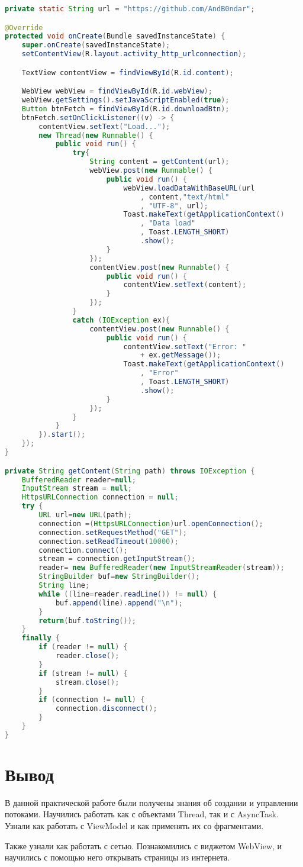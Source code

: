 \begin{lstlisting}[language=Java
	, label=lst:java:http-url-connection
	]
private static String url = "https://github.com/AndB0ndar";

@Override
protected void onCreate(Bundle savedInstanceState) {
	super.onCreate(savedInstanceState);
	setContentView(R.layout.activity_http_urlconnection);

	TextView contentView = findViewById(R.id.content);

	WebView webView = findViewById(R.id.webView);
	webView.getSettings().setJavaScriptEnabled(true);
	Button btnFetch = findViewById(R.id.downloadBtn);
	btnFetch.setOnClickListener((v) -> {
		contentView.setText("Load...");
		new Thread(new Runnable() {
			public void run() {
				try{
					String content = getContent(url);
					webView.post(new Runnable() {
						public void run() {
							webView.loadDataWithBaseURL(url
								, content,"text/html"
								, "UTF-8", url);
							Toast.makeText(getApplicationContext()
								, "Data load"
								, Toast.LENGTH_SHORT)
								.show();
						}
					});
					contentView.post(new Runnable() {
						public void run() {
							contentView.setText(content);
						}
					});
				}
				catch (IOException ex){
					contentView.post(new Runnable() {
						public void run() {
							contentView.setText("Error: "
								+ ex.getMessage());
							Toast.makeText(getApplicationContext()
								, "Error"
								, Toast.LENGTH_SHORT)
								.show();
						}
					});
				}
			}
		}).start();
	});
}

private String getContent(String path) throws IOException {
	BufferedReader reader=null;
	InputStream stream = null;
	HttpsURLConnection connection = null;
	try {
		URL url=new URL(path);
		connection =(HttpsURLConnection)url.openConnection();
		connection.setRequestMethod("GET");
		connection.setReadTimeout(10000);
		connection.connect();
		stream = connection.getInputStream();
		reader= new BufferedReader(new InputStreamReader(stream));
		StringBuilder buf=new StringBuilder();
		String line;
		while ((line=reader.readLine()) != null) {
			buf.append(line).append("\n");
		}
		return(buf.toString());
	}
	finally {
		if (reader != null) {
			reader.close();
		}
		if (stream != null) {
			stream.close();
		}
		if (connection != null) {
			connection.disconnect();
		}
	}
}
\end{lstlisting}

\clearpage

\section*{\LARGE{Вывод}}
В данной практической работе были получены знания об создании и управлении
потоками. Научились работать как с объектами Thread, так и с AsyncTask.
Узнали как работать с ViewModel и как применять их со фрагментами.\par
Также узнали как работать с сетью. Познакомились с виджетом WebView,
и научились с помощью него открывать страницы из интернета.

